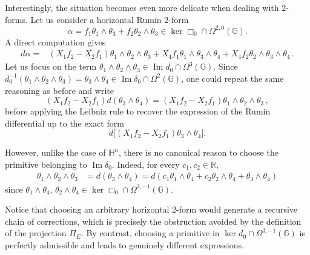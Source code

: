 \documentclass[dvipsnames]{amsart}
\theoremstyle{definition}
\theoremstyle{definition}
\numberwithin{equation}{section}
\newcommand{\G}{\mathbb{G}}
\renewcommand{\H}{\mathbb{H}}
\begin{document}
Interestingly, the situation becomes even more delicate when dealing with \(2\)-forms. Let us consider a horizontal Rumin \(2\)-form
\[
\alpha=f_1\theta_1\wedge\theta_3+f_2\theta_2\wedge\theta_3
\in\ker\Box_0\cap\Omega^{2,0}(\G).
\]
A direct computation gives
\begin{align*}
    d\alpha
    ={}&(X_1f_2-X_2f_1)\theta_1\wedge\theta_2\wedge\theta_3+X_4f_1\theta_1\wedge\theta_3\wedge\theta_4
    +X_4f_2\theta_2\wedge\theta_3\wedge\theta_4\,.
\end{align*}
Let us focus on the term $\theta_1\wedge\theta_2\wedge\theta_3\in\operatorname{Im}d_0\cap\Omega^3(\G)$.
Since $
d_0^{-1}(\theta_1\wedge\theta_2\wedge\theta_3)
=
\theta_3\wedge\theta_4
\in\operatorname{Im}\delta_0\cap\Omega^2(\G)$,
one could repeat the same reasoning as before and write
\[
(X_1f_2-X_2f_1)d(\theta_3\wedge\theta_4)
=
(X_1f_2-X_2f_1)\theta_1\wedge\theta_2\wedge\theta_3\,,
\] before applying the Leibniz rule to recover the expression of the Rumin differential up to the exact form
\[
d\big[(X_1f_2-X_2f_1)\theta_3\wedge\theta_4\big].
\]

However, unlike the case of \(\H^n\), there is no canonical reason to choose the primitive belonging to \(\operatorname{Im}\delta_0\). Indeed, for every \(c_1,c_2\in\mathbb R\),
\begin{align*}
    \theta_1\wedge\theta_2\wedge\theta_3
    &=
    d(\theta_3\wedge\theta_4)=
    d(c_1\theta_1\wedge\theta_4
    +c_2\theta_2\wedge\theta_4
    +\theta_3\wedge\theta_4)
\end{align*} since $\theta_1\wedge\theta_4,\,
\theta_2\wedge\theta_4
\in
\ker\Box_0\cap\Omega^{3,-1}(\G)$.

Notice that choosing an arbitrary horizontal \(2\)-form would generate a recursive chain of corrections, which is precisely the obstruction avoided by the definition of the projection \(\Pi_E\). By contrast, choosing a primitive in \(\ker d_0\cap\Omega^{3,-1}(\G)\) is perfectly admissible and leads to genuinely different expressions.
\end{document}
